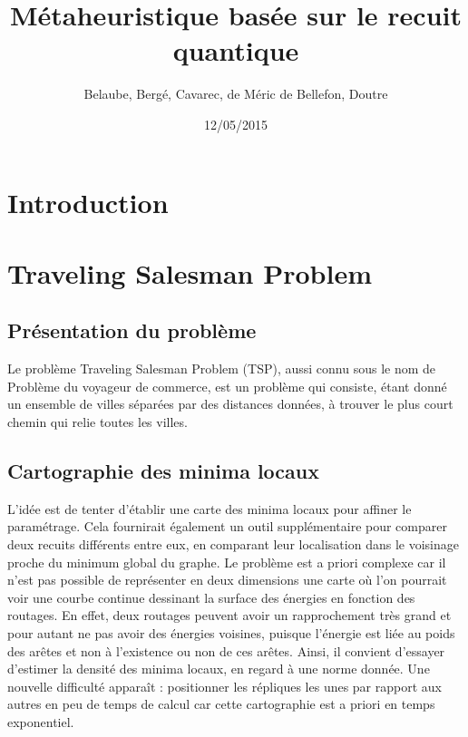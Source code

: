 \documentclass{article}%
\begin{document}
\title{Métaheuristique basée sur le recuit quantique}
\author{Belaube, Bergé, Cavarec, de Méric de Bellefon, Doutre}
\date{12/05/2015}
\maketitle

\clearpage

\tableofcontents

\clearpage

\section*{Introduction}

\clearpage


\section{Traveling Salesman Problem}

\subsection{Présentation du problème}

Le problème Traveling Salesman Problem (TSP), aussi connu sous le nom de Problème du voyageur de commerce, est un problème qui consiste, étant donné un ensemble de villes séparées par des distances données, à trouver le plus court chemin qui relie toutes les villes.\cite{Wikipedia}



\subsection{Cartographie des minima locaux}

L’idée est de tenter d’établir une carte des minima locaux pour affiner le paramétrage. Cela fournirait également un outil supplémentaire pour comparer deux recuits différents entre eux, en comparant leur localisation dans le voisinage proche du minimum global du graphe.
      Le problème est a priori complexe car il n’est pas possible de représenter en deux dimensions une carte où l’on pourrait voir une courbe continue dessinant la surface des énergies en fonction des routages. En effet, deux routages peuvent avoir un rapprochement très grand et pour autant ne pas avoir des énergies voisines, puisque l’énergie est liée au poids des arêtes et non à l’existence ou non de ces arêtes.
Ainsi, il convient d’essayer d’estimer la densité des minima locaux, en regard à une norme donnée. 
Une nouvelle difficulté apparaît : positionner les répliques les unes par rapport aux autres en peu de temps de calcul car cette cartographie est a priori en temps exponentiel. 
\end{document}
